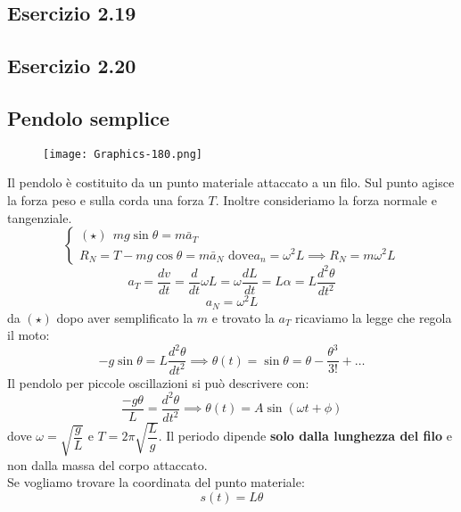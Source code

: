 \documentclass[../../main.tex]{subfiles}
\begin{document}
\subsection{Esercizio 2.19}
\subsection{Esercizio 2.20}

\subsection{Pendolo semplice}
\begin{figure}[H]
    \centering
    \texttt{[image: Graphics-180.png]}
\end{figure}
Il pendolo è costituito da un punto materiale attaccato a un filo. Sul punto agisce la forza peso e sulla corda una forza $T$. Inoltre consideriamo la forza normale e tangenziale.
\[
    \begin{cases}
        (\star) \ \ mg\sin\theta = m\bar a_T \\
        R_N = T - mg \cos\theta = m\bar a_N \text{ dove} a_n = \omega^2 L \implies R_N = m\omega^2 L
    \end{cases}
\]
\[
    a_T = \dfrac{dv}{dt} = \dfrac{d}{dt}\omega L = \omega \dfrac{dL}{dt} = L\alpha = L\dfrac{d^2\theta}{dt^2}
\]
\[
    a_N = \omega^2 L
\]
da $(\star)$ dopo aver semplificato la $m$ e trovato la $a_T$ ricaviamo la legge che regola il moto:
\[
    - g\sin\theta = L\dfrac{d^2\theta}{dt^2} \implies \theta(t) = \sin\theta = \theta - \dfrac{\theta^3}{3!} + \ldots
\]
Il pendolo per piccole oscillazioni si può descrivere con:
\[
    \dfrac{-g\theta}{L} = \dfrac{d^2\theta}{dt^2} \implies \theta(t) = A\sin(\omega t + \phi)
\]
dove $\omega = \sqrt{\dfrac{g}{L}}$ e $T = 2\pi\sqrt{\dfrac{L}{g}}$. Il periodo dipende \textbf{solo dalla lunghezza del filo} e non dalla massa del corpo attaccato.\\
Se vogliamo trovare la coordinata del punto materiale:
\[
    s(t) = L\theta
\]
\end{document}
